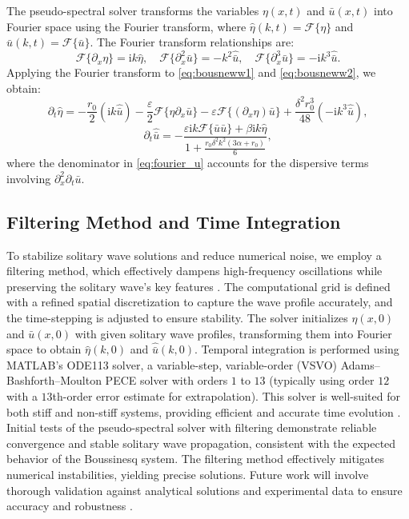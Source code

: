 \documentclass[alpha-refs, 12pt]{wiley-article}
\newcommand{\ui}{\mathrm{i}}
\newcommand{\eps}{\varepsilon}
\begin{document}
The pseudo-spectral solver transforms the variables $\eta(x,t)$ and $\bar{u}(x,t)$ into Fourier space using the Fourier transform, where $\hat{\eta}(k,t) = \mathcal{F}\{\eta\}$ and $\hat{\bar{u}}(k,t) = \mathcal{F}\{\bar{u}\}$. The Fourier transform relationships are:
\[
  \mathcal{F}\{\partial_x \eta\} = \ui k \hat{\eta}, \quad \mathcal{F}\{\partial_x^2 \bar{u}\} = -k^2 \hat{\bar{u}}, \quad \mathcal{F}\{\partial_x^3 \bar{u}\} = -\ui k^3 \hat{\bar{u}}.
\]
Applying the Fourier transform to \eqref{eq:bousneww1} and \eqref{eq:bousneww2}, we obtain:
\begin{equation}\label{eq:fourier_eta}
  \partial_t \hat{\eta} = - \frac{r_0}{2} (\ui k \hat{\bar{u}}) - \frac{\eps}{2} \mathcal{F}\{\eta \partial_x \bar{u}\} - \eps \mathcal{F}\{(\partial_x \eta) \bar{u}\} + \frac{\delta^2 r_0^3}{48} (-\ui k^3 \hat{\bar{u}}),
\end{equation}
\begin{equation}\label{eq:fourier_u}
  \partial_t \hat{\bar{u}} = - \frac{\eps \ui k \mathcal{F}\{\bar{u} \bar{u}\} + \beta \ui k \hat{\eta}}{1 + \frac{r_0 \delta^2 k^2 (3 \alpha + r_0)}{6}},
\end{equation}
where the denominator in \eqref{eq:fourier_u} accounts for the dispersive terms involving $\partial_x^2 \partial_t \bar{u}$.

\subsection{Filtering Method and Time Integration}

To stabilize solitary wave solutions and reduce numerical noise, we employ a filtering method, which effectively dampens high-frequency oscillations while preserving the solitary wave's key features \citep{BonaCh, Trefethen2000}. The computational grid is defined with a refined spatial discretization to capture the wave profile accurately, and the time-stepping is adjusted to ensure stability. The solver initializes $\eta(x,0)$ and $\bar{u}(x,0)$ with given solitary wave profiles, transforming them into Fourier space to obtain $\hat{\eta}(k,0)$ and $\hat{\bar{u}}(k,0)$. Temporal integration is performed using MATLAB's ODE113 solver, a variable-step, variable-order (VSVO) Adams--Bashforth--Moulton PECE solver with orders $1$ to $13$ (typically using order $12$ with a $13$th-order error estimate for extrapolation). This solver is well-suited for both stiff and non-stiff systems, providing efficient and accurate time evolution \citep{Boyd2000}. Initial tests of the pseudo-spectral solver with filtering demonstrate reliable convergence and stable solitary wave propagation, consistent with the expected behavior of the Boussinesq system. The filtering method effectively mitigates numerical instabilities, yielding precise solutions. Future work will involve thorough validation against analytical solutions and experimental data to ensure accuracy and robustness \citep{BonaCh,Trefethen2000}.
\end{document}
